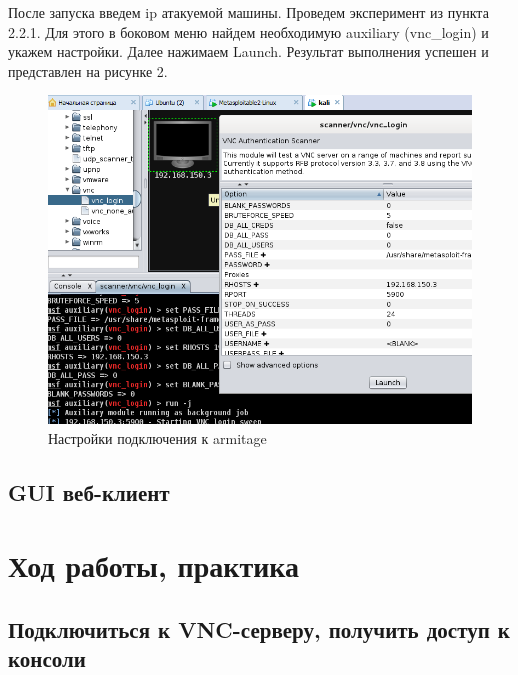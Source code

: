\documentclass[11pt, a4paper]{article}		%
\begin{document}
После запуска введем ip атакуемой машины. Проведем эксперимент из пункта 2.2.1. Для этого в боковом меню найдем необходимую auxiliary (vnc\_login) и укажем настройки. Далее нажимаем Launch. Результат выполнения успешен и представлен на рисунке 2.


\begin{figure}[h!]
\centering
\includegraphics[scale=0.8]{res/armitage_settings}
\caption{Настройки подключения к armitage}
\end{figure}


\subsection{GUI веб-клиент}




\section{Ход работы, практика}


\subsection{Подключиться к VNC-серверу, получить доступ к консоли}
\end{document}
